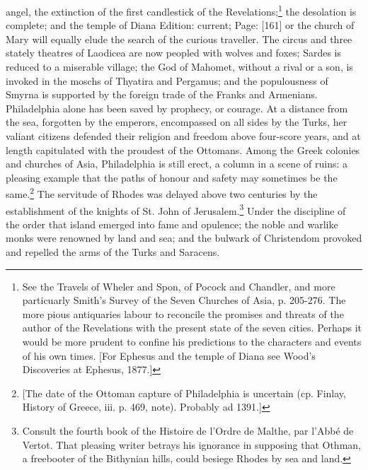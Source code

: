 angel, the extinction of the first candlestick of the Revelations;\footnote{See the Travels of Wheler and Spon, of Pocock and Chandler, and more particuarly Smith\texthebrew{}’s Survey of the Seven Churches of Asia, p. 205-276. The more pious antiquaries labour to reconcile the promises and threats of the author of the Revelations with the present state of the seven cities. Perhaps it would be more prudent to confine his predictions to the characters and events of his own times. [For Ephesus and the temple of Diana see Wood\texthebrew{}’s Discoveries at Ephesus, 1877.]} the desolation is complete; and the temple of Diana Edition: current; Page: [161] or the church of Mary will equally elude the search of the curious traveller. The circus and three stately theatres of Laodicea are now peopled with wolves and foxes; Sardes is reduced to a miserable village; the God of Mahomet, without a rival or a son, is invoked in the moschs of Thyatira and Pergamus; and the populousness of Smyrna is supported by the foreign trade of the Franks and Armenians. Philadelphia alone has been saved by prophecy, or courage. At a distance from the sea, forgotten by the emperors, encompassed on all sides by the Turks, her valiant citizens defended their religion and freedom above four-score years, and at length capitulated with the proudest of the Ottomans. Among the Greek colonies and churches of Asia, Philadelphia is still erect, a column in a scene of ruins: a pleasing example that the paths of honour and safety may sometimes be the same.\footnote{[The date of the Ottoman capture of Philadelphia is uncertain (cp. Finlay, History of Greece, iii. p. 469, note). Probably ad 1391.]} The servitude of Rhodes was delayed above two centuries by the establishment of the knights of St. John of Jerusalem.\footnote{Consult the fourth book of the Histoire de l\texthebrew{}’Ordre de Malthe, par l\texthebrew{}’Abbé de Vertot. That pleasing writer betrays his ignorance in supposing that Othman, a freebooter of the Bithynian hills, could besiege Rhodes by sea and land.} Under the discipline of the order that island emerged into fame and opulence; the noble and warlike monks were renowned by land and sea; and the bulwark of Christendom provoked and repelled the arms of the Turks and Saracens.

